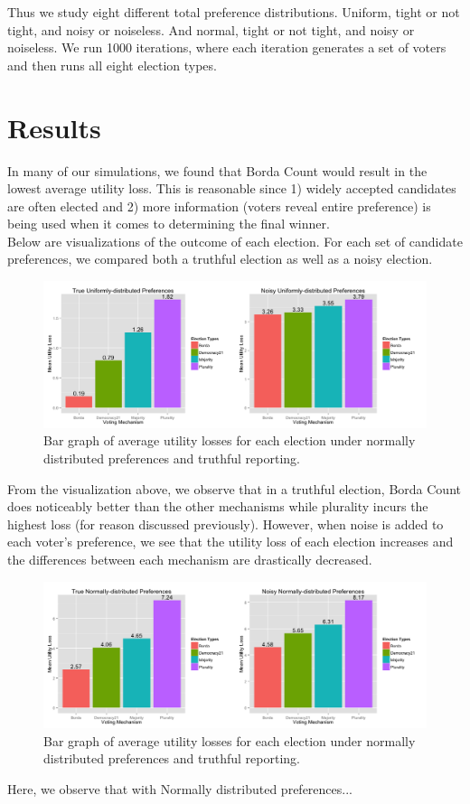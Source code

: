 \documentclass[11pt]{scrartcl}
\begin{document}
Thus we study eight different total preference distributions. Uniform, tight or not tight, and noisy or noiseless. And normal, tight or not tight, and noisy or noiseless. We run 1000 iterations, where each iteration generates a set of voters and then runs all eight election types.

\section{Results}

In many of our simulations, we found that Borda Count would result in the lowest average utility loss. This is reasonable since 1) widely accepted candidates are often elected and 2) more information (voters reveal entire preference) is being used when it comes to determining the final winner. \\

Below are visualizations of the outcome of each election. For each set of candidate preferences, we compared both a truthful election as well as a noisy election.  

\begin{figure}[H]\center
\includegraphics[scale=0.38]{uniform.png}
\caption{Bar graph of average utility losses for each election under normally distributed preferences and truthful reporting.}
\end{figure}

From the visualization above, we observe that in a truthful election, Borda Count does noticeably better than the other mechanisms while plurality incurs the highest loss (for reason discussed previously). However, when noise is added to each voter's preference, we see that the utility loss of each election increases and the differences between each mechanism are drastically decreased. 

\begin{figure}[H]\center
\includegraphics[scale=0.38]{normal.png}
\caption{Bar graph of average utility losses for each election under normally distributed preferences and truthful reporting.}
\end{figure}
Here, we observe that with Normally distributed preferences...
\end{document}
